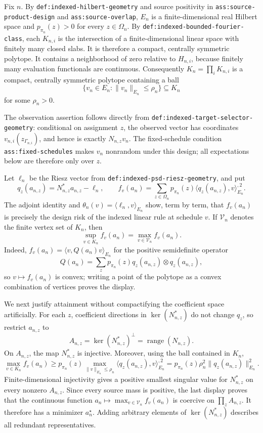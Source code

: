 Fix \(n\).  By \texttt{def:indexed-hilbert-geometry} and source positivity in \texttt{ass:source-product-design} and \texttt{ass:source-overlap}, \(E_n\) is a finite-dimensional real Hilbert space and \(p_{\pi_n}(z)>0\) for every \(z\in\Omega_n\).  By \texttt{def:indexed-bounded-fourier-class}, each \(K_{n,i}\) is the intersection of a finite-dimensional linear space with finitely many closed slabs.  It is therefore a compact, centrally symmetric polytope.  It contains a neighborhood of zero relative to \(H_{n,i}\), because finitely many evaluation functionals are continuous.  Consequently \(K_n=\prod_iK_{n,i}\) is a compact, centrally symmetric polytope containing a ball
\[
 \{v_n\in E_n:\|v_n\|_{E_n}\le \rho_n\}\subseteq K_n
\]
for some \(\rho_n>0\).

The observation assertion follows directly from \texttt{def:indexed-target-selector-geometry}: conditional on assignment \(z\), the observed vector has coordinates \(v_{n,i}(z_{\Gamma_{n,i}})\), and hence is exactly \(N_{n,z}v_n\).  The fixed-schedule condition \texttt{ass:fixed-schedules} makes \(v_n\) nonrandom under this design; all expectations below are therefore only over \(z\).

Let \(\ell_n\) be the Riesz vector from \texttt{def:indexed-psd-riesz-geometry}, and put
\[
 q_z(a_{n,z})=N_{n,z}^{\ast}a_{n,z}-\ell_n,
 \qquad
 f_v(a_n)=\sum_{z\in\Omega_n}p_{\pi_n}(z)
       \langle q_z(a_{n,z}),v\rangle_{E_n}^{,2}.
\]
The adjoint identity and \(\theta_n(v)=\langle\ell_n,v\rangle_{E_n}\) show, term by term, that \(f_v(a_n)\) is precisely the design risk of the indexed linear rule at schedule \(v\).  If \(\mathcal V_n\) denotes the finite vertex set of \(K_n\), then
\[
 \sup_{v\in K_n}f_v(a_n)=\max_{v\in\mathcal V_n}f_v(a_n).
\]
Indeed, \(f_v(a_n)=\langle v,Q(a_n)v\rangle_{E_n}\) for the positive semidefinite operator
\[
 Q(a_n)=\sum_zp_{\pi_n}(z)q_z(a_{n,z})\otimes q_z(a_{n,z}),
\]
so \(v\mapsto f_v(a_n)\) is convex; writing a point of the polytope as a convex combination of vertices proves the display.

We next justify attainment without compactifying the coefficient space artificially.  For each \(z\), coefficient directions in \(\ker(N_{n,z}^{\ast})\) do not change \(q_z\), so restrict \(a_{n,z}\) to
\[
 A_{n,z}=\ker(N_{n,z}^{\ast})^{\perp}=\operatorname{range}(N_{n,z}).
\]
On \(A_{n,z}\), the map \(N_{n,z}^{\ast}\) is injective.  Moreover, using the ball contained in \(K_n\),
\[
 \max_{v\in K_n}f_v(a_n)
 \ge p_{\pi_n}(z)\max_{\|v\|_{E_n}\le\rho_n}
          \langle q_z(a_{n,z}),v\rangle_{E_n}^{,2}
 =p_{\pi_n}(z)\rho_n^2\|q_z(a_{n,z})\|_{E_n}^2.
\]
Finite-dimensional injectivity gives a positive smallest singular value for \(N_{n,z}^{\ast}\) on every nonzero \(A_{n,z}\).  Since every source mass is positive, the last display proves that the continuous function \(a_n\mapsto\max_{v\in\mathcal V_n}f_v(a_n)\) is coercive on \(\prod_zA_{n,z}\).  It therefore has a minimizer \(a_n^{\star}\).  Adding arbitrary elements of \(\ker(N_{n,z}^{\ast})\) describes all redundant representatives.


